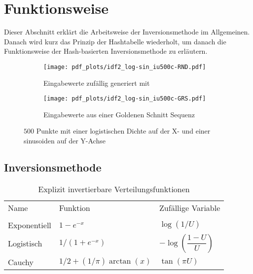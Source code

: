 \section{Funktionsweise}
\label{funktion}

Dieser Abschnitt erklärt die Arbeitsweise der Inversionsmethode im Allgemeinen. 
Danach wird kurz das Prinzip der Hashtabelle wiederholt, um danach die 
Funktionsweise der Hash-basierten Inversionsmethode zu erläutern.

\begin{figure*}%
    \centering
    \begin{subfigure}[b]{.3\textwidth}
        \centering
        \texttt{[image: pdf\_plots/idf2\_log-sin\_iu500c-RND.pdf]}
        \caption{Eingabewerte zufällig generiert mit }
        \label{fig:logsin_random}
    \end{subfigure}
    \hfill
    \begin{subfigure}[b]{.3\textwidth}
        \centering
        \texttt{[image: pdf\_plots/idf2\_log-sin\_iu500c-GRS.pdf]}
        \caption{Eingabewerte aus einer Goldenen Schnitt Sequenz}
        \label{fig:logsin_uniform}
    \end{subfigure}
    \caption{$500$ Punkte mit einer logistischen Dichte auf der X- und einer sinusoiden auf der Y-Achse}
    \label{fig:rand_vs_uniform}
\end{figure*}


\subsection{Inversionsmethode}
\begin{table}%
    \centering
    \begin{tabular}{lll}
    Name         & Funktion & Zufällige Variable \\
                 &          &                    \\
    Exponentiell & $1 - e^{-x}$ & $\log(1/U)$ \\
    Logistisch   & $1 / (1 + e^{-x})$ & $-\log(\dfrac{1-U}{U})$ \\
    Cauchy       & $1/2 + (1/\pi) \arctan(x)$ & $\tan(\pi U)$
    \end{tabular}
    \caption{Explizit invertierbare Verteilungsfunktionen \cite{devroye-non_uniform_random_variate-1986}}
    \label{tab:invFuncs}
\end{table}

